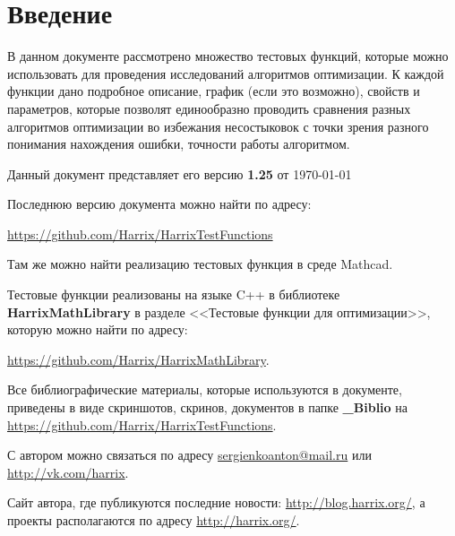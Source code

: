 \chapter*{Введение}

В данном документе рассмотрено множество тестовых функций, которые можно использовать для проведения исследований алгоритмов оптимизации. К каждой функции дано подробное описание, график (если это возможно), свойств и параметров, которые позволят единообразно проводить сравнения разных алгоритмов оптимизации во избежания несостыковок с точки зрения разного понимания нахождения ошибки, точности работы алгоритмом.

Данный документ представляет его версию \textbf{1.25} от \today

Последнюю версию документа можно найти по адресу:

\href{https://github.com/Harrix/HarrixTestFunctions}{https://github.com/Harrix/HarrixTestFunctions}

Там же можно найти реализацию тестовых функция в среде Mathcad.

Тестовые функции реализованы на языке C++ в библиотеке  \textbf{HarrixMathLibrary} в разделе <<Тестовые функции для оптимизации>>, которую можно найти по адресу:

\href{https://github.com/Harrix/HarrixMathLibrary} {https://github.com/Harrix/HarrixMathLibrary}.

Все библиографические материалы, которые используются в документе, приведены в виде скриншотов, скринов, документов в папке \textbf{\_Biblio} на \href{https://github.com/Harrix/HarrixTestFunctions}{https://github.com/Harrix/HarrixTestFunctions}.

С автором можно связаться по адресу \href{mailto:sergienkoanton@mail.ru}{sergienkoanton@mail.ru} или  \href{http://vk.com/harrix}{http://vk.com/harrix}.

Сайт автора, где публикуются последние новости: \href{http://blog.harrix.org/}{http://blog.harrix.org/}, а проекты располагаются по адресу \href{http://harrix.org/}{http://harrix.org/}.


\clearpage